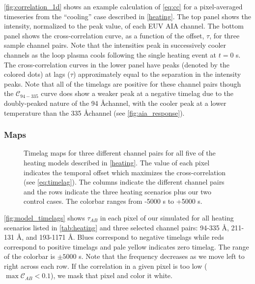 \autoref{fig:correlation_1d} shows an example calculation of \autoref{eq:cc} for a pixel-averaged timeseries from the ``cooling'' case described in \autoref{heating}. The top panel shows the intensity, normalized to the peak value, of each EUV AIA channel. The bottom panel shows the cross-correlation curve, as a function of the offset, $\tau$, for three sample channel pairs. Note that the intensities peak in successively cooler channels as the loop plasma cools following the single heating event at $t=0$ s. The cross-correlation curves in the lower panel have peaks (denoted by the colored dots) at lags ($\tau$) approximately equal to the separation in the intensity peaks. Note that all of the timelags are positive for these channel pairs though the $\mathcal{C}_{94-335}$ curve does show a weaker peak at a negative timelag due to the doubly-peaked nature of the 94 \AA channel, with the cooler peak at a lower temperature than the 335 \AA channel (see \autoref{fig:aia_response}).

\subsubsection{Maps}\label{timelag_maps}

\begin{figure*}
    \caption{Timelag maps for three different channel pairs for all five of the heating models described in \autoref{heating}. The value of each pixel indicates the temporal offset which maximizes the cross-correlation (see \autoref{eq:timelag}). The columns indicate the different channel pairs and the rows indicate the three heating scenarios plus our two control cases. The colorbar ranges from -5000 s to +5000 s.}
    \label{fig:model_timelags}
\end{figure*}

\autoref{fig:model_timelags} shows $\tau_{AB}$ in each pixel of our simulated \AR{} for all heating scenarios listed in \autoref{tab:heating} and three selected channel pairs: 94-335 \AA{}, 211-131 \AA{}, and 193-1171 \AA{}. Blues correspond to negative timelags while reds correspond to positive timelags and pale yellow indicates zero timelag. The range of the colorbar is $\pm5000$ s. Note that the frequency decreases as we move left to right across each row. If the correlation in a given pixel is too low ($\max{\mathcal{C}_{AB}}<0.1$), we mask that pixel and color it white. 

